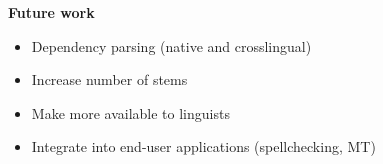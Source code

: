 \documentclass[fontscale=0.35,landscape,paperwidth=841mm,paperheight=1189mm]{baposter}  %
\newcommand{\htwo}[1]{{\htwofont \textbf{\dotfill{}#1\dotfill{}}}}
\begin{document}
\begin{poster}
{				%
			\htwo{Future work}
				\begin{itemize}
					\item Dependency parsing (native and crosslingual)
					\item Increase number of stems
					\item Make more available to linguists
					\item Integrate into end-user applications (spellchecking, MT)
				\end{itemize}
		}


\end{poster}
\end{document}
